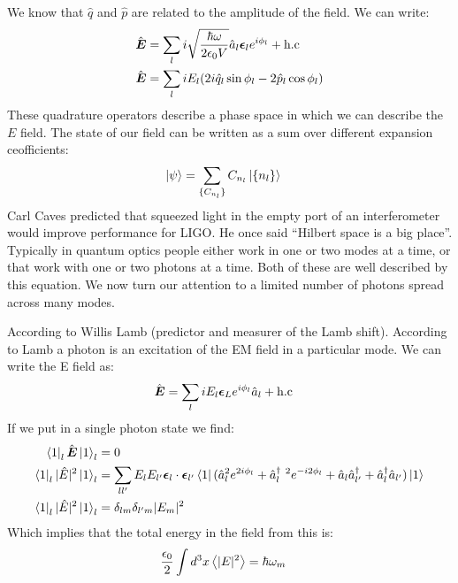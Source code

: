 We know that $\hat{q}$ and $\hat{p}$ are related to the amplitude of the field. We can write:
\begin{align*}
	\hat{\bm{E}} &= \sum_l i\sqrt{\frac{\hbar\omega}{2\epsilon_0 V}} \hat{a}_l \bm{\epsilon}_l e^{i\phi_l} + \text{h.c} \\
	\hat{\bm{E}} &= \sum_l iE_l (2i\hat{q}_l \sin\phi_l - 2\hat{p}_l\cos\phi_l)
\end{align*}
These quadrature operators describe a phase space in which we can describe the $E$ field. The state of our field can be written as a sum over different expansion ceofficients:
\begin{align*}
	\ket{\psi} &= \sum_{\{C_{n_l}\}} C_{n_l} \ket{\{n_l\}}
\end{align*}
Carl Caves predicted that squeezed light in the empty port of an interferometer would improve performance for LIGO. He once said ``Hilbert space is a big place''.
Typically in quantum optics people either work in one or two modes at a time, or that work with one or two photons at a time. Both of these are well described by this equation.
We now turn our attention to a limited number of photons spread across many modes.

According to Willis Lamb (predictor and measurer of the Lamb shift). According to Lamb a photon is an excitation of the EM field in a particular mode. We can write the E field as:
\begin{align*}
	\hat{\bm{E}} &= \sum_l iE_l \bm{\epsilon}_L e^{i\phi_l} \hat{a}_l + \text{h.c}
\end{align*}
If we put in a single photon state we find:
\begin{align*}
	\bra{1}_l \hat{\bm{E}} \ket{1}_l &= 0 \\
	\bra{1}_l |\hat{E}|^2 \ket{1}_l &= \sum_{ll'} E_l E_{l'} \bm{\epsilon}_l\cdot\bm{\epsilon}_{l'} \bra{1}(\hat{a}_l^2 e^{2i\phi_l} + \hat{a}_l^\dagger\ ^2 e^{-i2\phi_{l}} + \hat{a}_l\hat{a}^\dagger_{l'} + \hat{a}^\dagger_l\hat{a}_{l'})\ket{1} \\
	\bra{1}_l |\hat{E}|^2 \ket{1}_l &= \delta_{lm}\delta_{l'm} |E_m|^2
\end{align*}
Which implies that the total energy in the field from this is:
\begin{align*}
	\frac{\epsilon_0}{2}\int d^3 x\expval{|E|^2} &= \hbar\omega_m
\end{align*}

